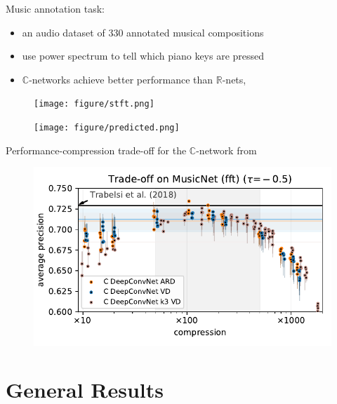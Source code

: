 \documentclass{beamer}
\newcommand{\real}{\mathbb{R}}
\newcommand{\cplx}{\mathbb{C}}
\begin{document}
\begin{frame}[c]{\insertsection}

Music annotation task:
\begin{itemize}
  \item an audio dataset of 330 annotated musical compositions
  \item use power spectrum to tell which piano keys are pressed
  \item $\cplx$-networks achieve better performance than $\real$-nets,
  \cite{trabelsi_deep_2018}
\end{itemize}
\begin{figure}[t]
  \centering
  \texttt{[image: figure/stft.png]}
  \par
  \texttt{[image: figure/predicted.png]}
\end{figure}

\end{frame}

\begin{frame}[c]{\insertsection}
Performance-compression trade-off for the $\cplx$-network from \cite{trabelsi_deep_2018}
  \begin{figure}[t]
    \centering
    \includegraphics[scale=0.55]{figure__musicnet__trade-off/paper__musicnetram__fft__-0.5.pdf}
  \end{figure}

\end{frame}


\section{General Results} %
\label{sec:general_results}
\end{document}
